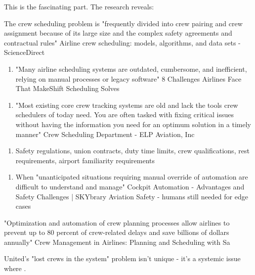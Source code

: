 This is the fascinating part. The research reveals:

 The crew scheduling problem is "frequently divided into crew pairing and crew assignment because of its large size and the complex safety agreements and contractual rules" 
Airline crew scheduling: models, algorithms, and data sets - ScienceDirect


\begin{enumerate}
\item {} "Many airline scheduling systems are outdated, cumbersome, and inefficient, relying on manual processes or legacy software" 8 Challenges Airlines Face That MakeShift Scheduling Solves
\end{enumerate}
\begin{enumerate}
\item {} "Most existing core crew tracking systems are old and lack the tools crew schedulers of today need. You are often tasked with fixing critical issues without having the information you need for an optimum solution in a timely manner" Crew Scheduling Department - ELP Aviation, Inc
\end{enumerate}
\begin{enumerate}
\item {} Safety regulations, union contracts, duty time limits, crew qualifications, rest requirements, airport familiarity requirements
\end{enumerate}
\begin{enumerate}
\item {} When "unanticipated situations requiring manual override of automation are difficult to understand and manage" Cockpit Automation - Advantages and Safety Challenges | SKYbrary Aviation Safety - humans still needed for edge cases
\end{enumerate}

 "Optimization and automation of crew planning processes allow airlines to prevent up to 80 percent of crew-related delays and save billions of dollars annually" 
Crew Management in Airlines: Planning and Scheduling with Sa

 United's "lost crews in the system" problem isn't unique - it's a systemic issue where 
.

